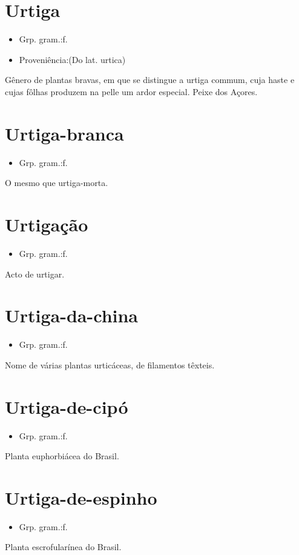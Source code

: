 \documentclass{article}
\begin{document}
\section{Urtiga}
\begin{itemize}
\item {Grp. gram.:f.}
\end{itemize}
\begin{itemize}
\item {Proveniência:(Do lat. \textunderscore urtica\textunderscore )}
\end{itemize}
Gênero de plantas bravas, em que se distingue a urtiga commum, cuja haste e cujas fôlhas produzem na pelle um ardor especial.
Peixe dos Açores.
\section{Urtiga-branca}
\begin{itemize}
\item {Grp. gram.:f.}
\end{itemize}
O mesmo que \textunderscore urtiga-morta\textunderscore .
\section{Urtigação}
\begin{itemize}
\item {Grp. gram.:f.}
\end{itemize}
Acto de urtigar.
\section{Urtiga-da-china}
\begin{itemize}
\item {Grp. gram.:f.}
\end{itemize}
Nome de várias plantas urticáceas, de filamentos têxteis.
\section{Urtiga-de-cipó}
\begin{itemize}
\item {Grp. gram.:f.}
\end{itemize}
Planta euphorbiácea do Brasil.
\section{Urtiga-de-espinho}
\begin{itemize}
\item {Grp. gram.:f.}
\end{itemize}
Planta escrofularínea do Brasil.
\end{document}
